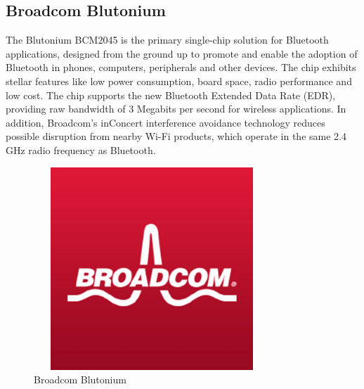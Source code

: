 \subsection{Broadcom Blutonium}
The Blutonium BCM2045 is the primary single-chip solution for Bluetooth applications, designed from the ground up to promote and enable the adoption of Bluetooth in phones, computers, peripherals and other devices. The chip exhibits stellar features like low power consumption, board space, radio performance and low cost. The chip supports the new Bluetooth Extended Data Rate (EDR), providing raw bandwidth of 3 Megabits per second for wireless applications. In addition, Broadcom’s inConcert interference avoidance technology reduces possible disruption from nearby Wi-Fi products, which operate in the same 2.4 GHz radio frequency as Bluetooth.
\begin{figure}[ht]
	\centering
	\includegraphics[width=3.5in, height=3in]{images/broadcom_blutonium.png}
	\caption{Broadcom Blutonium}
\end{figure}

